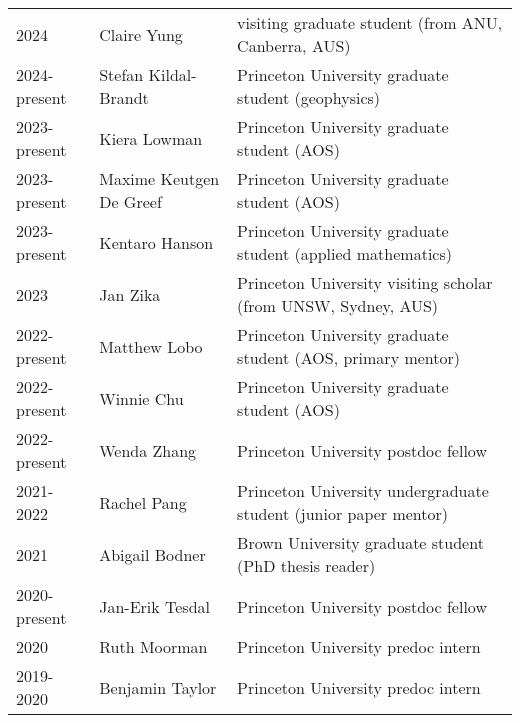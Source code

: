 \documentclass{article}
\begin{document}
\begin{tabular}{lll}

2024 & Claire Yung & visiting graduate student (from ANU, Canberra, AUS) \\

2024-present & Stefan Kildal-Brandt& Princeton University graduate student (geophysics) \\

2023-present & Kiera Lowman& Princeton University graduate student (AOS)  \\

2023-present & Maxime Keutgen De Greef& Princeton University graduate student (AOS) \\

2023-present & Kentaro Hanson& Princeton University graduate student (applied mathematics) \\

2023 & Jan Zika & Princeton University visiting scholar (from UNSW, Sydney, AUS) 
\\

2022-present & Matthew Lobo& Princeton University graduate student (AOS, primary mentor) \\

2022-present & Winnie Chu& Princeton University graduate student (AOS) \\

2022-present & Wenda Zhang& Princeton University postdoc fellow \\

2021-2022 & Rachel Pang& Princeton University undergraduate student (junior paper mentor) \\ 


2021 & Abigail Bodner& Brown University graduate student (PhD thesis reader) \\ 


2020-present & Jan-Erik Tesdal& Princeton University postdoc fellow \\ 

2020 & Ruth Moorman & Princeton University predoc intern \\ 

2019-2020 & Benjamin Taylor & Princeton University predoc intern \\ 


\end{tabular}
\end{document}
